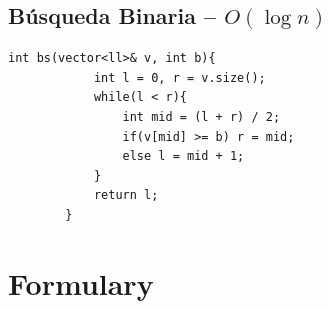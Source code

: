 \documentclass[10pt,a4paper,twocolumn]{article}
\begin{document}
	\subsection{B\'usqueda Binaria -- $O(\log n)$}
	
	\begin{lstlisting}[style=cpp, title={binary search.cpp}]
		int bs(vector<ll>& v, int b){
			int l = 0, r = v.size();
			while(l < r){
				int mid = (l + r) / 2;
				if(v[mid] >= b) r = mid;
				else l = mid + 1;
			}
			return l;
		}
	\end{lstlisting}
	

	\section{Formulary}
    
\end{document}
